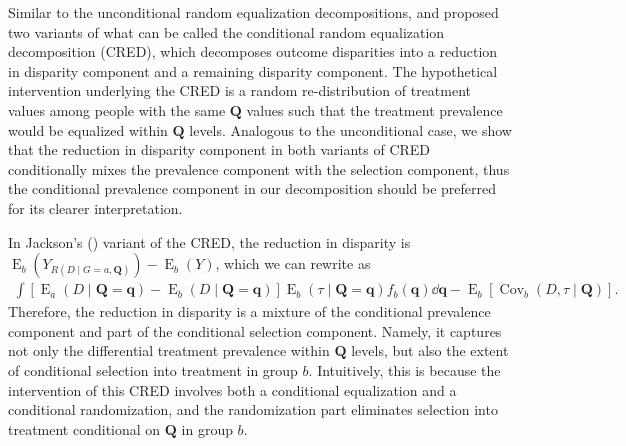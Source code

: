 \documentclass[12pt,a4paper]{article}
\newcommand{\Cov}{\operatorname{Cov}}
\newcommand{\E}{\operatorname{E}}
\def\Q{{\boldsymbol Q}}
\def\q{{\boldsymbol q}}
\begin{document}
Similar to the unconditional random equalization decompositions, \citet{jackson_meaningful_2021} and \citet{lundberg_gap-closing_2022} proposed two variants of what can be called the conditional random equalization decomposition (CRED), which decomposes outcome disparities into a reduction in disparity component and a remaining disparity component. The hypothetical intervention underlying the CRED is a random re-distribution of treatment values among people with the same $\Q$ values such that the treatment prevalence would be equalized within $\Q$ levels. Analogous to the unconditional case, we show that the reduction in disparity component in both variants of CRED conditionally mixes the prevalence component with the selection component, thus the conditional prevalence component in our decomposition should be preferred for its clearer interpretation. 

In Jackson's (\citeyear{jackson_meaningful_2021}) variant of the CRED, the reduction in disparity is $\E_b(Y_{R(D \mid G=a, \Q)})-\E_b(Y)$, which we can rewrite as 
\begin{gather}
\int  [\E_a(D \mid \Q=\q) - \E_b(D \mid \Q=\q)] \E_b(\tau \mid \Q=\q) f_b(\q) \dd \q - \E_b[\Cov_b(D, \tau \mid \Q)]. 
\end{gather}
Therefore, the reduction in disparity is a mixture of the conditional prevalence component and part of the conditional selection component. Namely, it captures not only the differential treatment prevalence within $\Q$ levels, but also the extent of conditional selection into treatment in group $b$. Intuitively, this is because the intervention of this CRED involves both a conditional equalization and a conditional randomization, and the randomization part eliminates selection into treatment conditional on $\Q$ in group $b$. 
\end{document}
